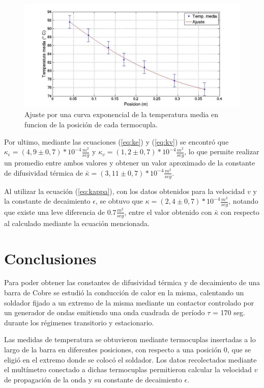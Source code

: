 \documentclass[twoside,twocolumn,a4paper]{article}
\begin{document}
\begin{figure}[H]
\includegraphics[width=\linewidth]{decaimiento.jpg}
\caption{Ajuste por una curva exponencial de la temperatura media en funcion de la posici\'on de cada termocupla.}
\label{fig:decaimiento}
\end{figure}

Por ultimo, mediante las ecuaciones (\ref{eq:ke}) y (\ref{eq:kv}) se encontr\'o que $\kappa_{\epsilon} = (4,9 \pm 0,7) * 10^{-4} \frac{m^{2}}{seg}$ y $\kappa_{v} = (1,2 \pm 0,7) * 10^{-4} \frac{m^{2}}{seg}$, lo que permite realizar un promedio entre ambos valores y obtener un valor aproximado de la constante de difusividad t\'ermica de $\bar{\kappa} = (3,11 \pm 0,7) * 10^{-4}  \frac{m^{2}}{seg}$.

Al utilizar la ecuaci\'on (\ref{eq:kappa}), con los datos obtenidos para la velocidad $v$ y la constante de decaimiento $\epsilon$, se obtuvo que $\kappa = (2,4 \pm 0,7) * 10^{-4} \frac{m^{2}}{seg}$, notando que existe una leve diferencia de $0.7\frac{m^{2}}{seg}$, entre el valor obtenido con $\bar{\kappa}$ con respecto al calculado mediante la ecuaci\'on mencionada.


\section{Conclusiones}

Para poder obtener las constantes de difusividad t\'ermica y de decaimiento de una barra de Cobre se estudi\'o la conducci\'on de calor en la misma, calentando un soldador fijado a un extremo de la misma mediante un contactor controlado por un generador de ondas emitiendo una onda cuadrada de per\'iodo $\tau$ = 170 seg. durante los r\'egimenes transitorio y estacionario. \newline

\par
Las medidas de temperatura se obtuvieron mediante termocuplas insertadas a lo largo de la barra en diferentes posiciones, con respecto a una posici\'on 0, que se eligi\'o en el extremo donde se coloc\'o el soldador. Los datos recolectados mediante el mult\'imetro conectado a dichas termocuplas permitieron calcular la velocidad $v$ de propagaci\'on de la onda y su constante de decaimiento $\epsilon$. \newline
\end{document}
